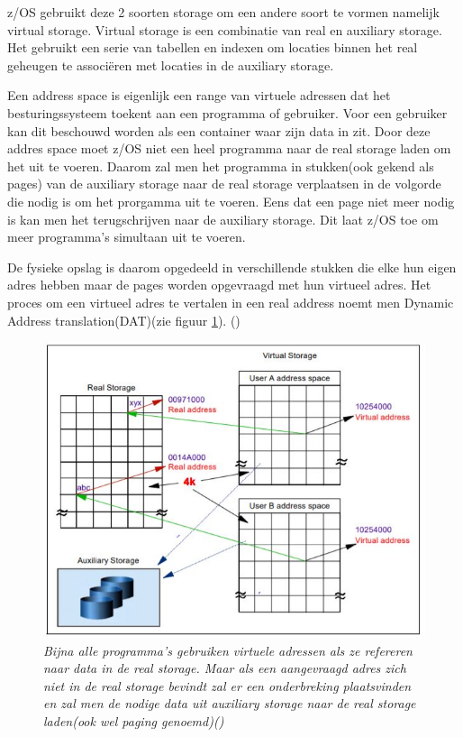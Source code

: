 z/OS gebruikt deze 2 soorten storage om een andere soort te vormen namelijk virtual storage. Virtual storage is een combinatie van real en auxiliary storage. Het gebruikt een serie van tabellen en indexen om locaties binnen het real geheugen te associëren met locaties in de auxiliary storage.

Een address space is eigenlijk een range van virtuele adressen dat het besturingssysteem toekent aan een programma of gebruiker. Voor een gebruiker kan dit beschouwd worden als een container waar zijn data in zit. Door deze addres space moet z/OS niet een heel programma naar de real storage laden om het uit te voeren. Daarom zal men het programma in stukken(ook gekend als pages) van de auxiliary storage naar de real storage verplaatsen in de volgorde die nodig is om het prorgamma uit te voeren. Eens dat een page niet meer nodig is kan men het terugschrijven naar de auxiliary storage. Dit laat z/OS toe om meer programma's simultaan uit te voeren.

De fysieke opslag is daarom opgedeeld in verschillende stukken die elke hun eigen adres hebben maar de pages worden opgevraagd met hun virtueel adres. Het proces om een virtueel adres te vertalen in een real address noemt men Dynamic Address translation(DAT)(zie figuur \ref{fig:storage}). (\cite{Ebbers2011})

\begin{figure}[h]
	\centering
	\includegraphics{img/Storage}
	\caption[Visualisatie van het concept van virtuele storage]{{\small \textit{Bijna alle programma's gebruiken virtuele adressen als ze refereren naar data in de real storage. Maar als een aangevraagd adres zich niet in de real storage bevindt zal er een onderbreking plaatsvinden en zal men de nodige data uit auxiliary storage naar de real storage laden(ook wel paging genoemd)(\cite{Ebbers2011})}}}
	\label{fig:storage}
\end{figure}

